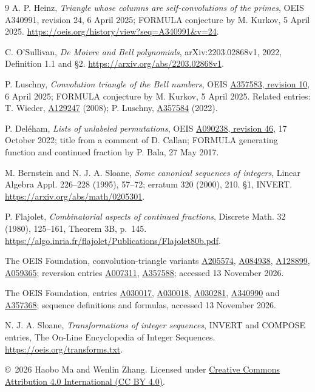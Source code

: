\documentclass[11pt]{article}
\begin{document}
\begin{thebibliography}{9}
A. P. Heinz, \emph{Triangle whose columns are self-convolutions of the
primes}, OEIS A340991, revision 24, 6 April 2025; FORMULA conjecture by
M. Kurkov, 5 April 2025.
\url{https://oeis.org/history/view?seq=A340991&v=24}.

C. O'Sullivan, \emph{De Moivre and Bell polynomials},
arXiv:2203.02868v1, 2022, Definition 1.1 and \S2.
\url{https://arxiv.org/abs/2203.02868v1}.

P. Luschny, \emph{Convolution triangle of the Bell numbers}, OEIS
\href{https://oeis.org/history/view?seq=A357583&v=10}{A357583, revision 10},
6 April 2025; FORMULA conjecture by M. Kurkov, 5 April 2025.
Related entries: T. Wieder, \href{https://oeis.org/A129247}{A129247}
(2008); P. Luschny, \href{https://oeis.org/A357584}{A357584} (2022).

P. Del\'eham, \emph{Lists of unlabeled permutations}, OEIS
\href{https://oeis.org/history/view?seq=A090238&v=46}{A090238, revision 46},
17 October 2022; title from a comment of D. Callan; FORMULA generating
function and continued fraction by P. Bala, 27 May 2017.

M. Bernstein and N. J. A. Sloane, \emph{Some canonical sequences of
integers}, Linear Algebra Appl. 226--228 (1995), 57--72;
erratum 320 (2000), 210. \S1, INVERT.
\url{https://arxiv.org/abs/math/0205301}.

P. Flajolet, \emph{Combinatorial aspects of continued fractions},
Discrete Math. 32 (1980), 125--161, Theorem 3B, p.~145.
\url{https://algo.inria.fr/flajolet/Publications/Flajolet80b.pdf}.

The OEIS Foundation, convolution-triangle variants
\href{https://oeis.org/A205574}{A205574},
\href{https://oeis.org/A084938}{A084938},
\href{https://oeis.org/A128899}{A128899},
\href{https://oeis.org/A059365}{A059365}; reversion entries
\href{https://oeis.org/A007311}{A007311},
\href{https://oeis.org/A357588}{A357588}; accessed 13 November 2026.

The OEIS Foundation, entries
\href{https://oeis.org/A030017}{A030017},
\href{https://oeis.org/A030018}{A030018},
\href{https://oeis.org/A030281}{A030281},
\href{https://oeis.org/A340990}{A340990} and
\href{https://oeis.org/A357368}{A357368};
sequence definitions and formulas, accessed 13 November 2026.

N. J. A. Sloane, \emph{Transformations of integer sequences}, INVERT and COMPOSE entries,
The On-Line Encyclopedia of Integer Sequences.
\url{https://oeis.org/transforms.txt}.
\end{thebibliography}

\bigskip\noindent\small
\copyright\ 2026 Haobo Ma and Wenlin Zhang.
Licensed under \href{https://creativecommons.org/licenses/by/4.0/}{Creative
Commons Attribution 4.0 International (CC BY 4.0)}.
\end{document}
